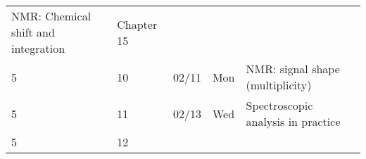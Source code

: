 \begin{longtable}[]{@{}llllll@{}}
\begin{minipage}[t]{0.49\columnwidth}
NMR: Chemical shift and integration\strut
\end{minipage} & \begin{minipage}[t]{0.17\columnwidth}\raggedright
Chapter 15\strut
\end{minipage}\tabularnewline
\begin{minipage}[t]{0.03\columnwidth}\raggedright
5\strut
\end{minipage} & \begin{minipage}[t]{0.03\columnwidth}\raggedright
10\strut
\end{minipage} & \begin{minipage}[t]{0.06\columnwidth}\raggedright
02/11\strut
\end{minipage} & \begin{minipage}[t]{0.04\columnwidth}\raggedright
Mon\strut
\end{minipage} & \begin{minipage}[t]{0.49\columnwidth}\raggedright
NMR: signal shape (multiplicity)\strut
\end{minipage} & \begin{minipage}[t]{0.17\columnwidth}\raggedright
\strut
\end{minipage}\tabularnewline
\begin{minipage}[t]{0.03\columnwidth}\raggedright
5\strut
\end{minipage} & \begin{minipage}[t]{0.03\columnwidth}\raggedright
11\strut
\end{minipage} & \begin{minipage}[t]{0.06\columnwidth}\raggedright
02/13\strut
\end{minipage} & \begin{minipage}[t]{0.04\columnwidth}\raggedright
Wed\strut
\end{minipage} & \begin{minipage}[t]{0.49\columnwidth}\raggedright
Spectroscopic analysis in practice\strut
\end{minipage} & \begin{minipage}[t]{0.17\columnwidth}\raggedright
\strut
\end{minipage}\tabularnewline
\begin{minipage}[t]{0.03\columnwidth}\raggedright
5\strut
\end{minipage} & \begin{minipage}[t]{0.03\columnwidth}\raggedright
12\strut
\end{minipage} & \begin{minipage}[t]{0.06\columnwidth}\raggedright

\end{minipage}
\end{longtable}
